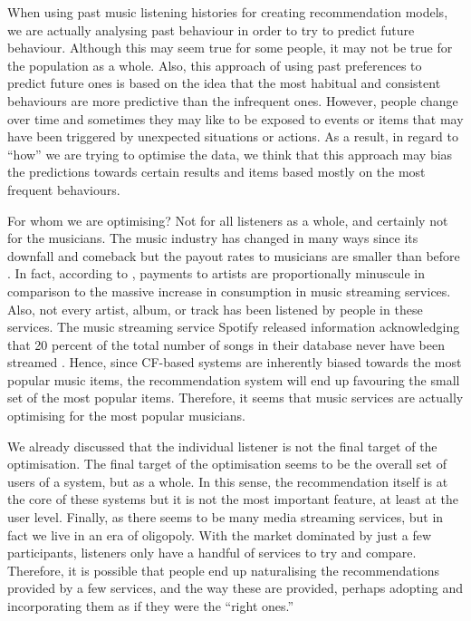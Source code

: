 When using past music listening histories for creating recommendation models, we are actually analysing past behaviour in order to try to predict future behaviour. Although this may seem true for some people, it may not be true for the population as a whole. 
Also, this approach of using past preferences to predict future ones is based on the idea that the most habitual and consistent behaviours are more predictive than the infrequent ones. 
However, people change over time and sometimes they may like to be exposed to events or items that may have been triggered by unexpected situations or actions.  
As a result, in regard to ``how'' we are trying to optimise the data, we think that this approach may bias the predictions towards certain results and items based mostly on the most frequent behaviours.

For whom we are optimising? Not for all listeners as a whole, and certainly not for the musicians. 
The music industry has changed in many ways since its downfall and comeback but the payout rates to musicians are smaller than before \autocite{ball15less}. 
In fact, according to \textcite{ifpi16global}, payments to artists are proportionally minuscule in comparison to the massive increase in consumption in music streaming services. 
Also, not every artist, album, or track has been listened by people in these services. The music streaming service Spotify released information acknowledging that 20 percent of the total number of songs in their database never have been streamed \autocite{spotify13percentage}. 
Hence, since CF-based systems are inherently biased towards the most popular music items, the recommendation system will end up favouring the small set of the most popular items. Therefore, it seems that music services are actually optimising for the most popular musicians. 

We already discussed that the individual listener is not the final target of the optimisation. The final target of the optimisation seems to be the overall set of users of a system, but as a whole. 
In this sense, the recommendation itself is at the core of these systems but it is not the most important feature, at least at the user level. 
Finally, as there seems to be many media streaming services, but in fact we live in an era of oligopoly. With the market dominated by just a few participants, listeners only have a handful of services to try and compare. Therefore, it is possible that people end up naturalising the recommendations provided by a few services, and the way these are provided, perhaps adopting and incorporating them as if they were the ``right ones.''




